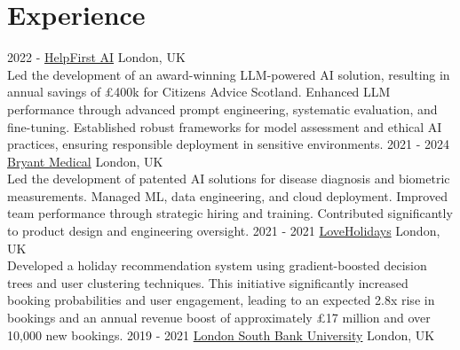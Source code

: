 \documentclass[print]{cv-style}          %
\begin{document}
\section{Experience}
\vspace{-0.2cm}
\begin{entrylist}
\entry
  {2022 - }
  {\href{https://www.helpfirst.ai/}{HelpFirst AI}}
  {London, UK}
  {
  \\
  Led the development of an award-winning LLM-powered AI solution, resulting in annual savings of £400k for Citizens Advice Scotland. Enhanced LLM performance through advanced prompt engineering, systematic evaluation, and fine-tuning. Established robust frameworks for model assessment and ethical AI practices, ensuring responsible deployment in sensitive environments.
  }
\entry
  {2021 - 2024}
  {\href{https://bryant.dental/}{Bryant Medical}}
  {London, UK}
  {
  \\
  Led the development of patented AI solutions for disease diagnosis and biometric measurements. Managed ML, data engineering, and cloud deployment. Improved team performance through strategic hiring and training. Contributed significantly to product design and engineering oversight.}
\entry
  {2021 - 2021}
  {\href{https://www.loveholidays.com/}{LoveHolidays}}
  {London, UK}
  {
  \\
  Developed a holiday recommendation system using gradient-boosted decision trees and user clustering techniques. This initiative significantly increased booking probabilities and user engagement, leading to an expected 2.8x rise in bookings and an annual revenue boost of approximately £17 million and over 10,000 new bookings.
  }
\vspace{-0.3cm} %
\entry
  {2019 - 2021}
  {\href{https://www.lsbu.ac.uk/}{London South Bank University}}
  {London, UK}
  {
  \\
  }

\end{entrylist}
\end{document}
